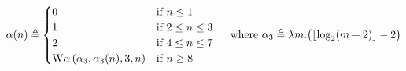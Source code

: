 {\begin{equation*}
\alpha(n) \triangleq \begin{cases}
0 & \text{if } n\le 1\\ 1 & \text{if } 2\le n\le 3 \\ 2 & \text{if } 4\le n\le 7 \\
\text{W}\alpha\left(\alpha_3,
\alpha_3(n), 3, n\right) & \text{if } n\ge 8
\end{cases} \quad \text{ where } \alpha_3 \triangleq \lambda m. \big(\lfloor \log_2(m+2) \rfloor - 2\big)
\end{equation*}
}